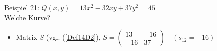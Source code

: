 \documentclass[a4paper]{scrartcl}
\begin{document}
Beispiel 21: $Q(x,y) = 13x^2 - 32xy + 37y^2 = 45$\\
Welche Kurve?
\begin{itemize}
\item Matrix $\underline{S}$ (vgl. (\ref{Def14D2}), $\underline{S}= \begin{pmatrix} 13 & -16 \\ -16 & 37 \end{pmatrix} \quad ( s_{12} = -16 )$
\end{itemize}
\end{document}
